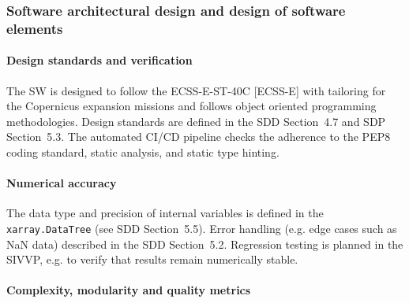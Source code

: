 \subsubsection{Software architectural design and design of software elements}
\label{subsec:software-architectural-design}

%
%
%
%
%

%
%
%
%

\paragraph*{Design standards and verification}

The SW is designed to follow the ECSS-E-ST-40C [ECSS-E] with tailoring for the Copernicus expansion missions and follows object oriented programming methodologies. Design standards are defined in the SDD Section~4.7 and SDP Section~5.3. The automated CI/CD pipeline checks the adherence to the PEP8 coding standard, static analysis, and static type hinting. 

\paragraph*{Numerical accuracy}

The data type and precision of internal variables is defined in the \texttt{xarray.DataTree} (see SDD Section~5.5). Error handling (e.g. edge cases such as NaN data) described in the SDD Section~5.2. Regression testing is planned in the SIVVP, e.g. to verify that results remain numerically stable.

\paragraph*{Complexity, modularity and quality metrics}

